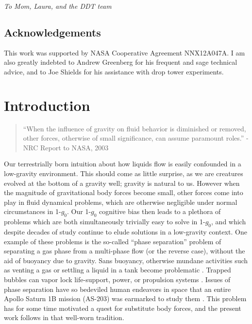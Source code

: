 \documentclass[12pt,a4paper,oneside]{book}
\newcommand\blankpage{%
    \null
    \thispagestyle{empty}%
    \addtocounter{page}{-1}%
    \newpage}
\begin{document}
\emph{To Mom, Laura, and the DDT team}\\
\vspace*{\fill}

\clearpage


\vspace*{\fill}
\section*{Acknowledgements}

This work was supported by NASA Cooperative Agreement NNX12A047A. I am also greatly indebted to Andrew Greenberg for his frequent and sage technical advice, and to Joe Shields for his assistance with drop tower experiments. \\ 
\vspace*{\fill}
\clearpage

\tableofcontents
\afterpage{\blankpage}
\listoffigures
\afterpage{\blankpage}

\mainmatter
\chapter{Introduction}
\begin{quote}
``When the influence of gravity on fluid behavior is diminished or removed, other forces, otherwise of small significance, can assume paramount roles.''
- NRC Report to NASA, 2003 \cite{motil_priorities_2012}
\end{quote}

Our terrestrially born intuition about how liquids flow is easily confounded in a low-gravity environment. This should come as little surprise, as we are creatures evolved at the bottom of a gravity well; gravity is natural to us. However when the magnitude of gravitational body forces become small, other forces come into play in fluid dynamical problems, which are otherwise negligible under normal circumstances in 1-$g_0$. Our 1-$g_0$ cognitive bias then leads to a plethora of problems which are both simultaneously trivially easy to solve in 1-$g_0$, and which despite decades of study continue to elude solutions in a low-gravity context. One example of these problems is the so-called ``phase separation'' problem of separating a gas phase from a multi-phase flow (or the reverse case), without the aid of buoyancy due to gravity. Sans buoyancy, otherwise mundane activities such as venting a gas or settling a liquid in a tank become problematic \cite{petrash_controlling_1964}. Trapped bubbles can vapor lock life-support, power, or propulsion systems \cite{jenson_passive_2014}. Issues of phase separation have so bedeviled human endeavors in space that an entire Apollo Saturn 1B mission (AS-203) was earmarked to study them \cite{hastings_saturn_1965}. This problem has for some time motivated a quest for substitute body forces, and the present work follows in that well-worn tradition.
\end{document}
